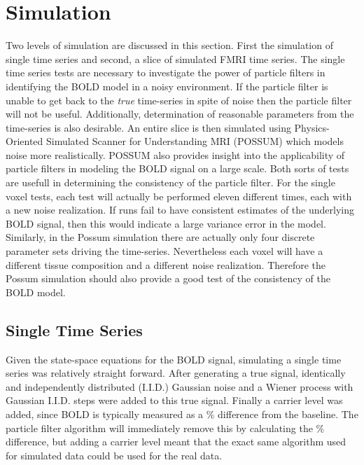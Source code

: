 \chapter{Simulation}
\label{sec:SimulationResults}
Two levels of simulation are discussed in this section. First the simulation of single time series
and second, a slice of simulated FMRI time series. The single time series tests
are necessary to investigate the power of particle filters in 
identifying the BOLD model in a noisy environment. If the particle filter is unable
to get back to the \emph{true} time-series in spite of noise then the particle filter
will not be useful. Additionally, determination of reasonable parameters from the
time-series is also desirable. An entire slice is then simulated using 
Physics-Oriented Simulated Scanner for Understanding MRI (POSSUM) which
models noise more realistically. POSSUM also provides insight into the 
applicability of particle filters in modeling the BOLD 
signal on a large scale. Both sorts of tests are usefull in determining the
consistency of the particle filter. For the single voxel tests, each test will
actually be performed eleven different times, each with a new noise realization.
If runs fail to have consistent estimates of the underlying BOLD signal, then
this would indicate a large variance error in the model. Similarly, in the
Possum simulation there are actually only four discrete parameter sets driving the time-series.
Nevertheless each voxel will have a different tissue composition and a different
noise realization. Therefore the Possum simulation should also provide a good
test of the consistency of the BOLD model. 

\section{Single Time Series}
\label{sec:Single Voxel Simulation}
Given the state-space equations for the BOLD signal, simulating a single time 
series was relatively straight forward. After generating a true signal,
identically and independently distributed (I.I.D.) Gaussian noise and a Wiener
process with Gaussian I.I.D. steps were added to this true signal. Finally a 
carrier level was added, since BOLD is typically
measured as a \% difference from the baseline. The particle filter
algorithm will immediately remove this by calculating the \% difference, 
but adding a carrier level meant that the exact same algorithm used 
for simulated data could be used for the real data. 

